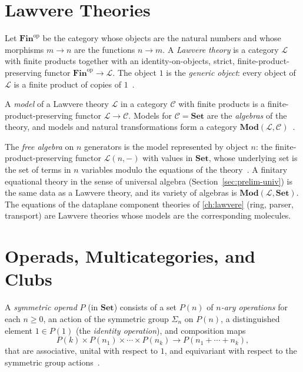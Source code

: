 \section{Lawvere Theories}\label{sec:prelim-lawvere}

\begin{definition}
Let $\mathbf{Fin}^{\mathrm{op}}$ be the category whose objects are the
natural numbers and whose morphisms $m \to n$ are the functions $n \to m$.
A \emph{Lawvere theory} is a category $\mathcal{L}$ with finite products
together with an identity-on-objects, strict, finite-product-preserving
functor $\mathbf{Fin}^{\mathrm{op}} \to \mathcal{L}$. The object $1$ is the
\emph{generic object}: every object of $\mathcal{L}$ is a finite product of
copies of $1$~\cite{lawvere, arxiv-lawvere}.
\end{definition}

\begin{definition}
A \emph{model} of a Lawvere theory $\mathcal{L}$ in a category $\mathcal{C}$
with finite products is a finite-product-preserving functor
$\mathcal{L} \to \mathcal{C}$. Models for $\mathcal{C} = \mathbf{Set}$ are
the \emph{algebras} of the theory, and models and natural transformations
form a category $\mathbf{Mod} (\mathcal{L}, \mathcal{C})$~\cite{lawvere,
arxiv-lawvere}.
\end{definition}

\begin{remark}
The \emph{free algebra} on $n$ generators is the model represented by object
$n$: the finite-product-preserving functor $\mathcal{L} (n,-)$ with values in
$\mathbf{Set}$, whose underlying set is the set of terms in $n$ variables
modulo the equations of the theory~\cite{lawvere}. A finitary equational
theory in the sense of universal algebra (Section~\ref{sec:prelim-univ}) is
the same data as a Lawvere theory, and its variety of algebras is
$\mathbf{Mod} (\mathcal{L}, \mathbf{Set})$. The equations of the dataplane
component theories of \autoref{ch:lawvere} (ring, parser, transport) are
Lawvere theories whose models are the corresponding molecules.
\end{remark}

\section{Operads, Multicategories, and Clubs}\label{sec:prelim-operads}

\begin{definition}
A \emph{symmetric operad} $P$ (in $\mathbf{Set}$) consists of a set $P (n)$
of \emph{$n$-ary operations} for each $n \geq 0$, an action of the symmetric
group $\Sigma_n$ on $P (n)$, a distinguished element $1 \in P (1)$ (the
\emph{identity operation}), and composition maps
\[ P (k) \times P (n_1) \times \cdots \times P (n_k)
   \to P (n_1 + \cdots + n_k), \]
that are associative, unital with respect to $1$, and equivariant with
respect to the symmetric group actions~\cite{leinster, arxiv-operads}.
\end{definition}

